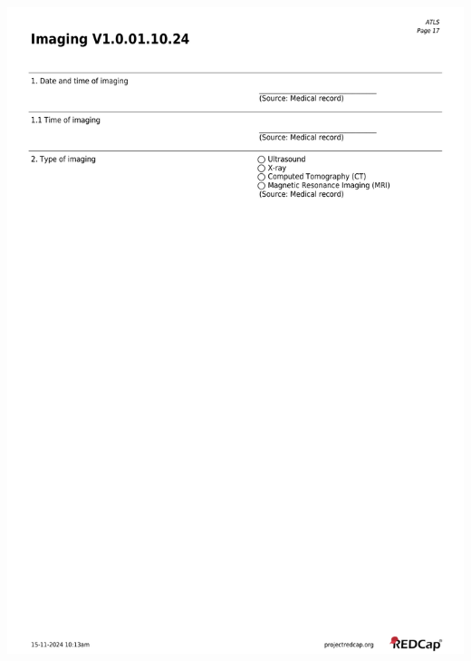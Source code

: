\documentclass[
]{scrartcl}
\begin{document}
\includegraphics{../case-record-form/instrument-pdfs/pages/all-instruments-17.pdf}
\end{document}
